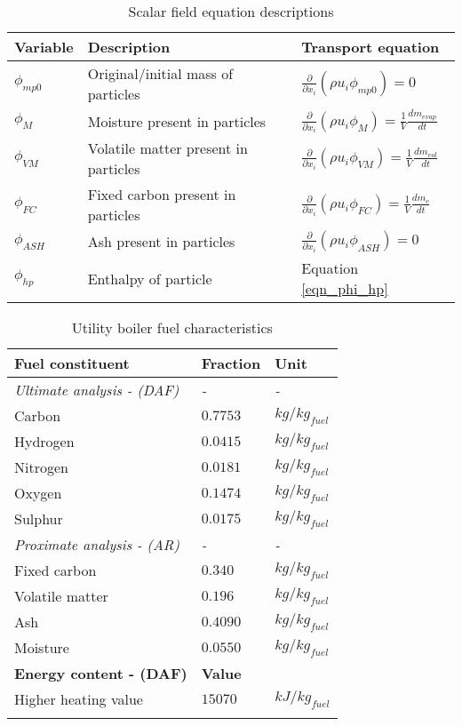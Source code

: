 \documentclass[11pt,cleanfoot]{asme2ej}
\begin{document}
\begin{table}[h!]
\centering
\caption{Scalar field equation descriptions}\label{tab_scalars}  
\vspace{2mm}     
\begin{tabularx}{\textwidth}{p{} p{} l}
\hline
Variable &Description& Transport equation \\
\hline
$\phi_{mp0}$ &Original/initial mass of particles& $\frac{\partial}{\partial x_{i}}(\rho u_{i} \phi_{mp0})=0$\\
$\phi_{M}$&Moisture present in particles&$\frac{\partial}{\partial x_{i}}(\rho u_{i} \phi_{M})=\frac{1}{V} \frac{dm_{evap}}{dt}$\\
$\phi_{VM}$&Volatile matter present in particles&  $\frac{\partial}{\partial x_{i}}(\rho u_{i} \phi_{VM})=\frac{1}{V}\frac{dm_{vol}}{dt}$\\
$\phi_{FC}$&Fixed carbon present in particles&$\frac{\partial}{\partial x_{i}}(\rho u_{i} \phi_{FC})=\frac{1}{V}\frac{dm_c}{dt}$\\
$\phi_{ASH}$&Ash present in particles&$\frac{\partial}{\partial x_{i}}(\rho u_{i} \phi_{ASH})=0$\\
$\phi_{hp}$&Enthalpy of particle&Equation \eqref{eqn_phi_hp}\\
\hline
\end{tabularx}
\end{table}

\newpage
\begin{table*}[h!]
\centering
\caption{Utility boiler fuel characteristics}
\vspace{2mm}
\label{tbl_fuel}
\begin{tabularx}{\textwidth}{p{} p{} l}
\hline
\textbf{Fuel constituent} & \textbf{Fraction} & \textbf{Unit}\\
\hline
\textit{Ultimate analysis - (DAF)} & \textit{-} & \textit{-}\\
Carbon & $0.7753$ & $kg/kg_{fuel}$\\
Hydrogen & $0.0415$ & $kg/kg_{fuel}$\\
Nitrogen & $0.0181$ & $kg/kg_{fuel}$\\
Oxygen & $0.1474$ & $kg/kg_{fuel}$\\
Sulphur & $0.0175$ & $kg/kg_{fuel}$\\
\textit{Proximate analysis - (AR)} & \textit{-} & \textit{-}\\
Fixed carbon & $0.340$ & $kg/kg_{fuel}$\\
Volatile matter & $0.196$ & $kg/kg_{fuel}$\\
Ash & $0.4090$ & $kg/kg_{fuel}$\\
Moisture & $0.0550$ & $kg/kg_{fuel}$\\
\hline
\textbf{Energy content - (DAF)} & \textbf{Value} &\\
\hline
Higher heating value & $15070$ & $kJ/kg_{fuel}$\\
\hline
\vspace{0pt}
\end{tabularx}
\vspace{-10mm}
\end{table*}
\end{document}
